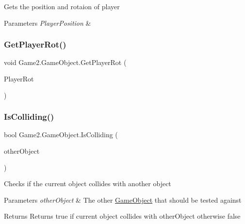 Gets the position and rotaion of player 


\begin{DoxyParams}{Parameters}
{\em Player\+Position} & \\
\hline
\end{DoxyParams}
\mbox{\label{class_game2_1_1_game_object_aae6ebb6727aabac812b8bcc68aba2484}} 
\subsubsection{\texorpdfstring{Get\+Player\+Rot()}{GetPlayerRot()}}
{\footnotesize\ttfamily void Game2.\+Game\+Object.\+Get\+Player\+Rot (\begin{DoxyParamCaption}\item[{float}]{Player\+Rot }\end{DoxyParamCaption})}

\mbox{\label{class_game2_1_1_game_object_a043206229a679b32a1bee4f50e8e7ace}} 
\subsubsection{\texorpdfstring{Is\+Colliding()}{IsColliding()}}
{\footnotesize\ttfamily bool Game2.\+Game\+Object.\+Is\+Colliding (\begin{DoxyParamCaption}\item[{\mbox{\hyperlink{class_game2_1_1_game_object}{Game\+Object}}}]{other\+Object }\end{DoxyParamCaption})}



Checks if the current object collides with another object 


\begin{DoxyParams}{Parameters}
{\em other\+Object} & The other \mbox{\hyperlink{class_game2_1_1_game_object}{Game\+Object}} that should be tested against\\
\hline
\end{DoxyParams}
\begin{DoxyReturn}{Returns}
Returns true if current object collides with other\+Object otherwise false
\end{DoxyReturn}
\mbox{\label{class_game2_1_1_game_object_a9db72e4b451539bf698e5e1dcd6e12c4}} 
